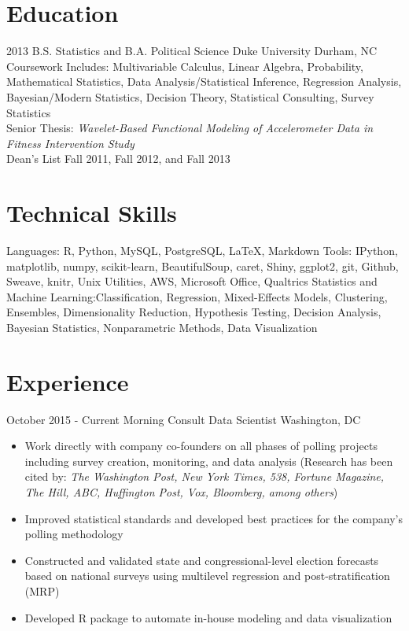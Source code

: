 \documentclass[10pt,a4paper,sans]{moderncv}        %
\begin{document}
\makecvtitle\vspace{-6ex}                          %

\section{Education} 
\cventry
	{2013}
	{B.S. Statistics and B.A. Political Science}
	{Duke University}
	{Durham, NC}
	{}
	{Coursework Includes: Multivariable Calculus, Linear Algebra, Probability, Mathematical Statistics, 
	Data Analysis/Statistical Inference, Regression Analysis, Bayesian/Modern Statistics, Decision Theory,
	Statistical Consulting, Survey Statistics
	\\Senior Thesis: \textit{Wavelet-Based Functional Modeling of Accelerometer Data in Fitness Intervention Study}
	\\Dean's List Fall 2011, Fall 2012, and Fall 2013} 

\section{Technical Skills}
\cvitem
  {Languages:}
  {R, Python, MySQL, PostgreSQL, \LaTeX, Markdown}
\cvitem
  {Tools:}
  {IPython, matplotlib, numpy, scikit-learn, BeautifulSoup, caret, Shiny, ggplot2, git, Github, Sweave, knitr, Unix Utilities, AWS,
  Microsoft Office, Qualtrics}
\cvitem
  {Statistics and Machine Learning:}{Classification, Regression, Mixed-Effects Models, Clustering, Ensembles, Dimensionality Reduction,
  Hypothesis Testing, Decision Analysis, Bayesian Statistics, Nonparametric Methods, Data Visualization}

\section{Experience}
\cventry
  {October 2015 - Current}
  {Morning Consult Data Scientist}
  {}
  {Washington, DC}
  {}
  {
    \begin{itemize}
      \item{Work directly with company co-founders on all phases of polling projects including survey creation, monitoring, and data analysis
      (Research has been cited by: \textit{The Washington Post, New York Times, 538, Fortune Magazine, The Hill, ABC, Huffington Post, Vox, Bloomberg, among others})}
      \item{Improved statistical standards and developed best practices for the company’s polling methodology}
      \item{Constructed and validated state and congressional-level election forecasts based on national surveys using multilevel regression 
      and post-stratification (MRP)}
      \item{Developed R package to automate in-house modeling and data visualization}
    \end{itemize}
  }
  
\end{document}
